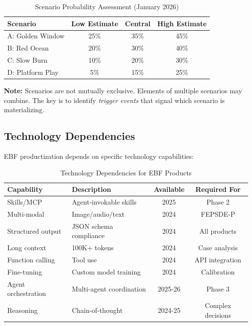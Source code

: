 \begin{table}[htbp]
\centering
\caption{Scenario Probability Assessment (January 2026)}
\label{tab:vvv-probability}
\renewcommand{\arraystretch}{1.3}
\begin{tabular}{@{}lccc@{}}
\toprule
\textbf{Scenario} & \textbf{Low Estimate} & \textbf{Central} & \textbf{High Estimate} \\
\midrule
A: Golden Window & 25\% & 35\% & 45\% \\
B: Red Ocean & 20\% & 30\% & 40\% \\
C: Slow Burn & 10\% & 20\% & 30\% \\
D: Platform Play & 5\% & 15\% & 25\% \\
\bottomrule
\end{tabular}
\end{table}

\textbf{Note:} Scenarios are not mutually exclusive. Elements of multiple scenarios may combine. The key is to identify \textit{trigger events} that signal which scenario is materializing.


\subsection{Technology Dependencies}

EBF productization depends on specific technology capabilities:

\begin{table}[htbp]
\centering
\caption{Technology Dependencies for EBF Products}
\label{tab:vvv-tech-deps}
\renewcommand{\arraystretch}{1.3}
\begin{tabular}{@{}lp{5cm}cc@{}}
\toprule
\textbf{Capability} & \textbf{Description} & \textbf{Available} & \textbf{Required For} \\
\midrule
Skills/MCP & Agent-invokable skills & 2025 & Phase 2 \\
Multi-modal & Image/audio/text & 2024 & FEPSDE-P \\
Structured output & JSON schema compliance & 2024 & All products \\
Long context & 100K+ tokens & 2024 & Case analysis \\
Function calling & Tool use & 2024 & API integration \\
Fine-tuning & Custom model training & 2024 & Calibration \\
Agent orchestration & Multi-agent coordination & 2025-26 & Phase 3 \\
Reasoning & Chain-of-thought & 2024-25 & Complex decisions \\
\bottomrule
\end{tabular}
\end{table}


